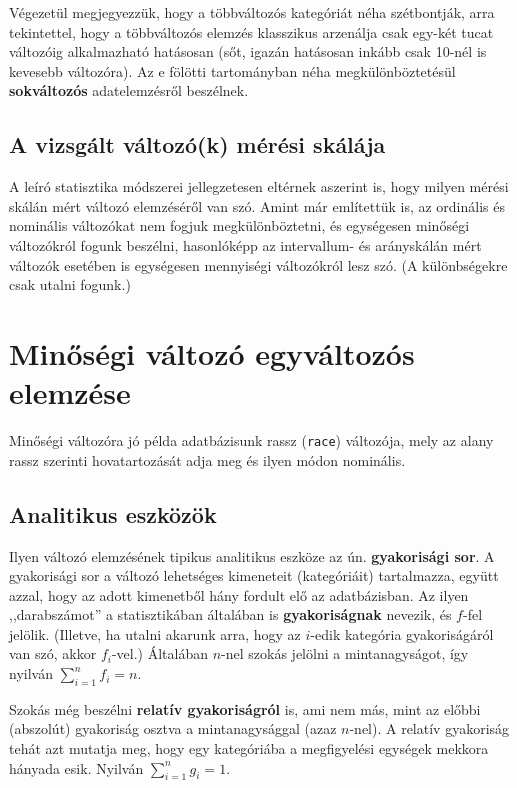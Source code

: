 \documentclass[]{book}
\begin{document}
Végezetül megjegyezzük, hogy a többváltozós kategóriát néha szétbontják,
arra tekintettel, hogy a többváltozós elemzés klasszikus arzenálja csak
egy-két tucat változóig alkalmazható hatásosan (sőt, igazán hatásosan
inkább csak 10-nél is kevesebb változóra). Az e fölötti tartományban
néha megkülönböztetésül \textbf{sokváltozós} adatelemzésről beszélnek.

\subsection{A vizsgált változó(k) mérési
skálája}\label{deskriptivcsoportositasmeresiskala}

A leíró statisztika módszerei jellegzetesen eltérnek aszerint is, hogy
milyen mérési skálán mért változó elemzéséről van szó. Amint már
említettük is, az ordinális és nominális változókat nem fogjuk
megkülönböztetni, és egységesen minőségi változókról fogunk beszélni,
hasonlóképp az intervallum- és arányskálán mért változók esetében is
egységesen mennyiségi változókról lesz szó. (A különbségekre csak utalni
fogunk.)

\section{Minőségi változó egyváltozós
elemzése}\label{deskriptivminegyvalt}

Minőségi változóra jó példa adatbázisunk rassz (\texttt{race})
változója, mely az alany rassz szerinti hovatartozását adja meg és ilyen
módon nominális.

\subsection{Analitikus eszközök}\label{deskriptivmonegyvaltanalitikus}

Ilyen változó elemzésének tipikus analitikus eszköze az ún.
\textbf{gyakorisági sor}. A gyakorisági sor a változó lehetséges
kimeneteit (kategóriáit) tartalmazza, együtt azzal, hogy az adott
kimenetből hány fordult elő az adatbázisban. Az ilyen ,,darabszámot'' a
statisztikában általában is \textbf{gyakoriságnak} nevezik, és \(f\)-fel
jelölik. (Illetve, ha utalni akarunk arra, hogy az \(i\)-edik kategória
gyakoriságáról van szó, akkor \(f_i\)-vel.) Általában \(n\)-nel szokás
jelölni a mintanagyságot, így nyilván \(\sum_{i=1}^n f_i = n\).

Szokás még beszélni \textbf{relatív gyakoriságról} is, ami nem más, mint
az előbbi (abszolút) gyakoriság osztva a mintanagysággal (azaz
\(n\)-nel). A relatív gyakoriság tehát azt mutatja meg, hogy egy
kategóriába a megfigyelési egységek mekkora hányada esik. Nyilván
\(\sum_{i=1}^n g_i = 1\).
\end{document}
